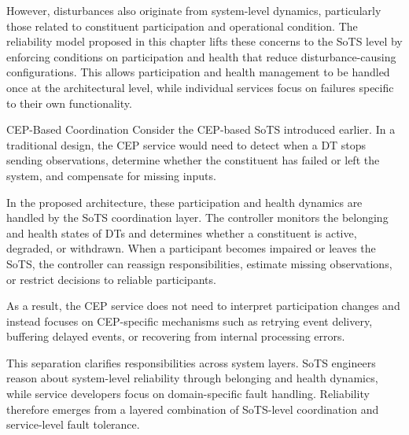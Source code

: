 However, disturbances also originate from system-level dynamics, particularly those related to constituent participation and operational condition. The reliability model proposed in this chapter lifts these concerns to the SoTS level by enforcing conditions on participation and health that reduce disturbance-causing configurations. This allows participation and health management to be handled once at the architectural level, while individual services focus on failures specific to their own functionality.

\begin{runningexample}{CEP-Based Coordination}
Consider the CEP-based SoTS introduced earlier. In a traditional design, the CEP service would need to detect when a DT stops sending observations, determine whether the constituent has failed or left the system, and compensate for missing inputs.

In the proposed architecture, these participation and health dynamics are handled by the SoTS coordination layer. The controller monitors the belonging and health states of DTs and determines whether a constituent is active, degraded, or withdrawn. When a participant becomes impaired or leaves the SoTS, the controller can reassign responsibilities, estimate missing observations, or restrict decisions to reliable participants.

As a result, the CEP service does not need to interpret participation changes and instead focuses on CEP-specific mechanisms such as retrying event delivery, buffering delayed events, or recovering from internal processing errors.
\end{runningexample}

This separation clarifies responsibilities across system layers. SoTS engineers reason about system-level reliability through belonging and health dynamics, while service developers focus on domain-specific fault handling. Reliability therefore emerges from a layered combination of SoTS-level coordination and service-level fault tolerance.

